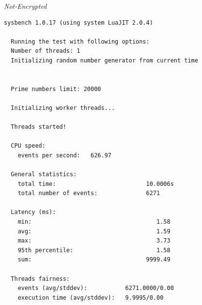 \noindent\begin{minipage}[t]{0.45\linewidth}
  \centering
  \textit{Not-Encrypted}
  \begin{lstlisting}[basicstyle=\tiny,frame=single, label=cpu_test2]
  sysbench 1.0.17 (using system LuaJIT 2.0.4)

  Running the test with following options:
  Number of threads: 1
  Initializing random number generator from current time
  
  
  Prime numbers limit: 20000
  
  Initializing worker threads...
  
  Threads started!
  
  CPU speed:
    events per second:   626.97
  
  General statistics:
    total time:                          10.0006s
    total number of events:              6271
  
  Latency (ms):
    min:                                    1.58
    avg:                                    1.59
    max:                                    3.73
    95th percentile:                        1.58
    sum:                                 9999.49
  
  Threads fairness:
    events (avg/stddev):           6271.0000/0.00
    execution time (avg/stddev):   9.9995/0.00
    
  \end{lstlisting}
\end{minipage}

\newpage
